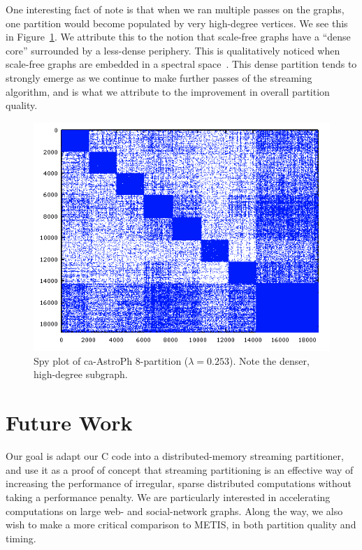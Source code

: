\documentclass[11pt]{article}
\begin{document}
One interesting fact of note is that when we ran multiple passes on the graphs, one partition would become populated by very high-degree vertices. We see this in Figure~\ref{fig:dense}. We attribute this to the notion that scale-free graphs have a ``dense core'' surrounded by a less-dense periphery. This is qualitatively noticed when scale-free graphs are embedded in a spectral space~\cite{Lang04findinggood}. This dense partition tends to strongly emerge as we continue to make further passes of the streaming algorithm, and is what we attribute to the improvement in overall partition quality.

\begin{figure}[h!]
\centering
  \includegraphics[width=.7\textwidth]{figures/astroPh8.png}
  \caption{Spy plot of ca-AstroPh 8-partition ($\lambda=0.253$). Note the denser, high-degree subgraph.}
  \label{fig:dense}
\end{figure}

\section{Future Work}
Our goal is adapt our C code into a distributed-memory streaming partitioner, and use it as a proof of concept that streaming partitioning is an effective way of increasing the performance of irregular, sparse distributed computations without taking a performance penalty. We are particularly interested in accelerating computations on large web- and social-network graphs. Along the way, we also wish to make a more critical comparison to METIS, in both partition quality and timing.


\newpage



\end{document}
